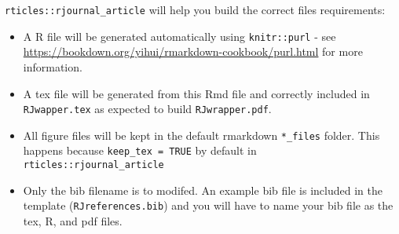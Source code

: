 \texttt{rticles::rjournal\_article} will help you build the correct
files requirements:

\begin{itemize}
\tightlist
\item
  A R file will be generated automatically using \texttt{knitr::purl} -
  see \url{https://bookdown.org/yihui/rmarkdown-cookbook/purl.html} for
  more information.
\item
  A tex file will be generated from this Rmd file and correctly included
  in \texttt{RJwapper.tex} as expected to build \texttt{RJwrapper.pdf}.
\item
  All figure files will be kept in the default rmarkdown
  \texttt{*\_files} folder. This happens because
  \texttt{keep\_tex\ =\ TRUE} by default in
  \texttt{rticles::rjournal\_article}
\item
  Only the bib filename is to modifed. An example bib file is included
  in the template (\texttt{RJreferences.bib}) and you will have to name
  your bib file as the tex, R, and pdf files.
\end{itemize}



\address{%
Maximiliano Cubillos\\
Aarhus University\\%
\\
%
%
%
\\\href{mailto:mcub@econ.au.dk}{\nolinkurl{mcub@econ.au.dk}}
}

\address{%
Jesper N. Wulff\\
Aarhus University\\%
\\
%
%
%
\\\href{mailto:jwulff@econ.au.dk}{\nolinkurl{jwulff@econ.au.dk}}
}

\address{%
Sanne Wøhlk\\
Aarhus University\\%
\\
%
%
%
\\\href{mailto:sanw@econ.au.dk}{\nolinkurl{sanw@econ.au.dk}}
}
